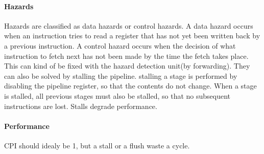 			\paragraph{Hazards}
				Hazards are classified as data hazards or control hazards. A data hazard occurs when an instruction tries to read a register that has not yet been written back by a previous instruction. A control hazard occurs when the decision of what instruction to fetch next has not been made by the time the fetch takes place. This can kind of be fixed with the hazard detection unit(by forwarding). They can also be solved by stalling the pipeline. stalling a stage is performed by disabling the pipeline register, so that the contents do not change. When a stage is stalled, all previous stages must also be stalled, so that no subsequent instructions are lost. Stalls degrade performance.
			\paragraph{Performance}
				CPI should idealy be 1, but a stall or a flush waste a cycle.


















